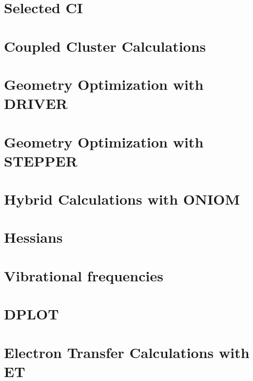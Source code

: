 \chapter{Selected CI}


\chapter{Coupled Cluster Calculations}


%


\chapter{Geometry Optimization with DRIVER}


\chapter{Geometry Optimization with STEPPER}


\chapter{Hybrid Calculations with ONIOM}


\chapter{Hessians}


\chapter{Vibrational frequencies}


\chapter{DPLOT}


\chapter{Electron Transfer Calculations with ET}


